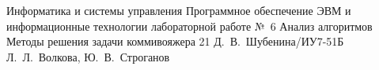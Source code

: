 \makereporttitle
    {Информатика и системы управления} %
    {Программное обеспечение ЭВМ и информационные технологии} %
    {лабораторной работе №~6} %
    {Анализ алгоритмов} %
    {Методы решения задачи коммивояжера} %
    {21} %
    {Д.~В.~Шубенина/ИУ7-51Б} %
	{Л.~Л.~Волкова, Ю.~В.~Строганов} %